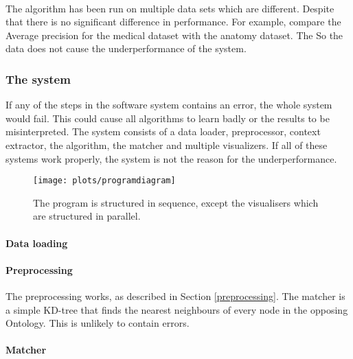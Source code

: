 \documentclass{article}
\begin{document}
  \paragraph{}
 The algorithm has been run on multiple data sets which are different. Despite that there is no significant difference in performance. For example, compare the Average precision for the medical dataset with the anatomy dataset. The %
 So the data does not cause the underperformance of the system.
 
  \subsubsection{The system}
  If any of the steps in the software system contains an error, the whole system would fail. This could cause all algorithms to learn badly or the results to be misinterpreted. The system consists of a data loader, preprocessor, context extractor, the algorithm, the matcher and multiple visualizers. If all of these systems work properly, the system is not the reason for the underperformance.
  
  \begin{figure}[H]
  \texttt{[image: plots/programdiagram]}
  \label{program}
  \caption[Program diagram]{The program is structured in sequence, except the visualisers which are structured in parallel.}
  \end{figure}
  
  \paragraph{Data loading}
  \paragraph{Preprocessing}
  The preprocessing works, as described in Section \ref{preprocessing}.  The matcher is a simple KD-tree that finds the nearest neighbours of every node in the opposing Ontology. This is unlikely to contain errors.
  \paragraph{Matcher}
\end{document}
